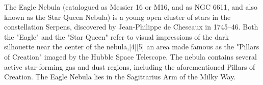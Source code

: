 The Eagle Nebula (catalogued as Messier 16 or M16, and as NGC 6611, and also known as the Star Queen Nebula) is a young open cluster of stars in the constellation Serpens, discovered by Jean-Philippe de Cheseaux in 1745–46. Both the "Eagle" and the "Star Queen" refer to visual impressions of the dark silhouette near the center of the nebula,[4][5] an area made famous as the "Pillars of Creation" imaged by the Hubble Space Telescope. The nebula contains several active star-forming gas and dust regions, including the aforementioned Pillars of Creation. The Eagle Nebula lies in the Sagittarius Arm of the Milky Way.
